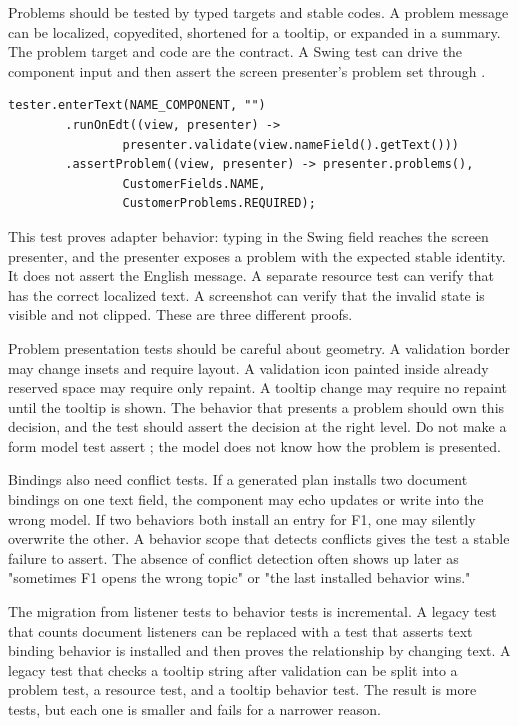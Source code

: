 Problems should be tested by typed targets and stable codes. A problem message can be localized, copyedited, shortened for a tooltip, or expanded in a summary. The problem target and code are the contract. A Swing test can drive the component input and then assert the screen presenter's problem set through .

\begin{lstlisting}[caption={Asserting a problem by field key and code.}]
tester.enterText(NAME_COMPONENT, "")
        .runOnEdt((view, presenter) ->
                presenter.validate(view.nameField().getText()))
        .assertProblem((view, presenter) -> presenter.problems(),
                CustomerFields.NAME,
                CustomerProblems.REQUIRED);
\end{lstlisting}

This test proves adapter behavior: typing in the Swing field reaches the screen presenter, and the presenter exposes a problem with the expected stable identity. It does not assert the English message. A separate resource test can verify that  has the correct localized text. A screenshot can verify that the invalid state is visible and not clipped. These are three different proofs.

Problem presentation tests should be careful about geometry. A validation border may change insets and require layout. A validation icon painted inside already reserved space may require only repaint. A tooltip change may require no repaint until the tooltip is shown. The behavior that presents a problem should own this decision, and the test should assert the decision at the right level. Do not make a form model test assert ; the model does not know how the problem is presented.

Bindings also need conflict tests. If a generated plan installs two document bindings on one text field, the component may echo updates or write into the wrong model. If two behaviors both install an  entry for F1, one may silently overwrite the other. A behavior scope that detects conflicts gives the test a stable failure to assert. The absence of conflict detection often shows up later as "sometimes F1 opens the wrong topic" or "the last installed behavior wins."

The migration from listener tests to behavior tests is incremental. A legacy test that counts document listeners can be replaced with a test that asserts text binding behavior is installed and then proves the relationship by changing text. A legacy test that checks a tooltip string after validation can be split into a problem test, a resource test, and a tooltip behavior test. The result is more tests, but each one is smaller and fails for a narrower reason.

